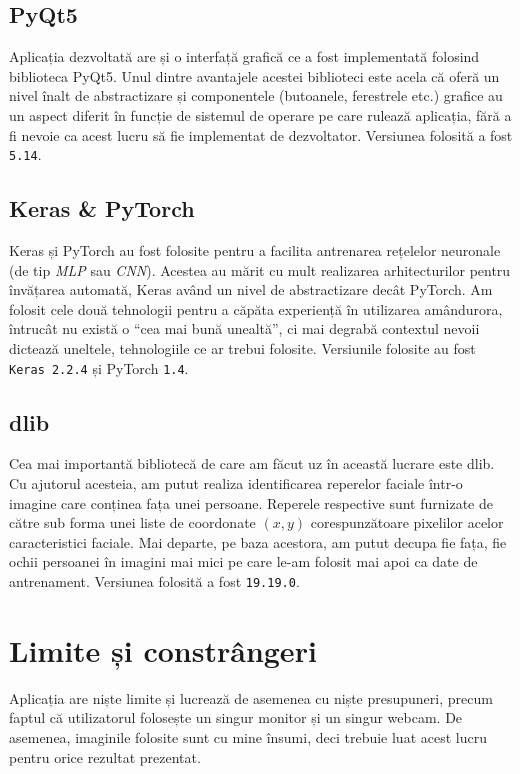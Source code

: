 \subsection{PyQt5}
Aplicația dezvoltată are și o interfață grafică ce a fost implementată folosind biblioteca PyQt5.
Unul dintre avantajele acestei biblioteci este acela că oferă un nivel înalt de abstractizare și componentele (butoanele, ferestrele etc.) grafice au un aspect diferit în funcție de sistemul de operare pe care rulează aplicația, fără a fi nevoie ca acest lucru să fie implementat de dezvoltator.
Versiunea folosită a fost \lstinline{5.14}.

\subsection{Keras \& PyTorch}
Keras și PyTorch au fost folosite pentru a facilita antrenarea rețelelor neuronale (de tip \emph{MLP} sau \emph{CNN}).
Acestea au mărit cu mult realizarea arhitecturilor pentru învățarea automată, Keras având un nivel de abstractizare decât PyTorch.
Am folosit cele două tehnologii pentru a căpăta experiență în utilizarea amândurora, întrucât nu există o ``cea mai bună unealtă'', ci mai degrabă contextul nevoii dictează uneltele, tehnologiile ce ar trebui folosite.
Versiunile folosite au fost \lstinline{Keras 2.2.4} și PyTorch \lstinline{1.4}.

\subsection{dlib}
Cea mai importantă bibliotecă de care am făcut uz în această lucrare este dlib.
Cu ajutorul acesteia, am putut realiza identificarea reperelor faciale într-o imagine care conținea fața unei persoane.
Reperele respective sunt furnizate de către sub forma unei liste de coordonate $(x, y)$ corespunzătoare pixelilor acelor caracteristici faciale.
Mai departe, pe baza acestora, am putut decupa fie fața, fie ochii persoanei în imagini mai mici pe care le-am folosit mai apoi ca date de antrenament.
Versiunea folosită a fost \lstinline{19.19.0}.

\section{Limite și constrângeri}
Aplicația are niște limite și lucrează de asemenea cu niște presupuneri, precum faptul că utilizatorul folosește un singur monitor și un singur webcam.
De asemenea, imaginile folosite sunt cu mine însumi, deci trebuie luat acest lucru pentru orice rezultat prezentat.

